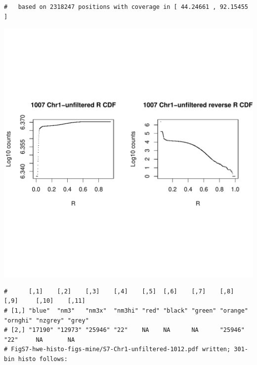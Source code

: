 \documentclass{article}\usepackage[]{graphicx}\usepackage[]{color}
\makeatletter
\def\maxwidth{ %
  \ifdim\Gin@nat@width>\linewidth
    \linewidth
  \else
    \Gin@nat@width
  \fi
}
\newenvironment{kframe}{%
 \def\at@end@of@kframe{}%
 \ifinner\ifhmode%
  \def\at@end@of@kframe{\end{minipage}}%
  \begin{minipage}{\columnwidth}%
 \fi\fi%
 \def\FrameCommand##1{\hskip\@totalleftmargin \hskip-\fboxsep
 \colorbox{shadecolor}{##1}\hskip-\fboxsep
     \hskip-\linewidth \hskip-\@totalleftmargin \hskip\columnwidth}%
 \MakeFramed {\advance\hsize-\width
   \@totalleftmargin\z@ \linewidth\hsize
   \@setminipage}}%
 {\par\unskip\endMakeFramed%
 \at@end@of@kframe}
\newenvironment{knitrout}{}{} %
\makeatother
\begin{document}
\begin{knitrout}
\begin{kframe}
\begin{verbatim}
#   based on 2318247 positions with coverage in [ 44.24661 , 92.15455 ]
\end{verbatim}
\end{kframe}
\includegraphics[width=\maxwidth]{FigS7-hwe-histo-figs-knitr/unnamed-chunk-10-16} 
\begin{kframe}\begin{verbatim}
#      [,1]    [,2]    [,3]    [,4]    [,5]  [,6]    [,7]    [,8]     [,9]     [,10]    [,11] 
# [1,] "blue"  "nm3"   "nm3x"  "nm3hi" "red" "black" "green" "orange" "ornghi" "nzgrey" "grey"
# [2,] "17190" "12973" "25946" "22"    NA    NA      NA      "25946"  "22"     NA       NA    
# FigS7-hwe-histo-figs-mine/S7-Chr1-unfiltered-1012.pdf written; 301-bin histo follows:
\end{verbatim}
\end{kframe}

\end{knitrout}
\end{document}
